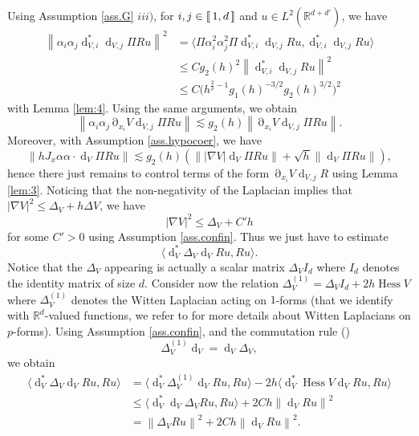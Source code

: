 \documentclass[12pt]{amsart}
\newcommand{\R}{\mathbb R}
\newcommand{\Hess}{\operatorname{Hess}}
\def\<{\langle}
\def\>{\rangle}
\renewcommand{\d}{\operatorname{d}}
\numberwithin{equation}{section}
\numberwithin{figure}{section}
\DeclareMathOperator{\p}{\partial}
\newcommand{\vvert}[1]{\left\lVert#1\right\rVert}
\newcommand{\lb}{\operatorname{[\negthinspace [}}
\newcommand{\rb}{\operatorname{]\negthinspace ]}}
\begin{document}
Using Assumption \ref{ass.G} $iii)$, for $i,j\in\lb1,d\rb$ and $u\in L^2(\R^{d+d'})$, we have
\begin{equation*}
\begin{aligned}
    \vvert{\alpha_i\alpha_j\d_{V,i}^*\d_{V,j}\Pi Ru}^2 &= \<\Pi \alpha_i^2\alpha_j^2\Pi\d_{V,i}^*\d_{V,j}Ru,\d_{V,i}^*\d_{V,j}Ru\>\\
    &\leq Cg_2(h)^2\vvert{\d_{V,i}^*\d_{V,j}Ru}^2\\
    &\leq C\big(h^{\frac{2}{\overline{\nu}} - 1}g_1(h)^{-3/2}g_2(h)^{3/2}\big)^2
\end{aligned}
\end{equation*}
with Lemma \ref{lem:4}. Using the same arguments, we obtain
\begin{equation*}
\vvert{\alpha_i\alpha_j\p_{x_i}V\d_{V,j}\Pi Ru} \lesssim g_2(h)\vvert{\p_{x_i}V\d_{V,j}\Pi Ru}.
\end{equation*}
Moreover, with Assumption \ref{ass.hypocoer}, we have
\begin{equation*}
\vvert{hJ_x\alpha\alpha\cdot\d_V\Pi Ru} \lesssim g_2(h)(\vvert{|\nabla V|\d_V\Pi Ru} + \sqrt{h}\vvert{\d_V\Pi Ru}),
\end{equation*}
hence there just remains to control terms of the form $\p_{x_i}V\d_{V,j}R$ using Lemma \ref{lem:3}. Noticing that the non-negativity of the Laplacian implies that $|\nabla V|^2\leq \Delta_V + h\Delta V$, we have
\begin{equation}\label{eq:nablaVleqDeltaV}
|\nabla V|^2\leq\Delta_V + C'h
\end{equation}
for some $C'>0$ using Assumption \ref{ass.confin}. Thus we just have to estimate
\begin{equation*}
\<\d_V^*\Delta_V\d_VRu,Ru\>.
\end{equation*}
Notice that the $\Delta_V$ appearing is actually a scalar matrix $\Delta_VI_d$ where $I_d$ denotes the identity matrix of size $d$. Consider now the relation $\Delta_V^{(1)} = \Delta_VI_d + 2h\Hess V$ where $\Delta_V^{(1)}$ denotes the Witten Laplacian acting on $1$-forms (that we identify with $\R^d$-valued functions, we refer to \cite{HeSj85_01} for more details about Witten Laplacians on $p$-forms). Using Assumption \ref{ass.confin}, and the commutation rule (\cite[(2.1)]{HeKlNi04_01})
\begin{equation*}
\Delta_V^{(1)}\d_V = \d_V\Delta_V,
\end{equation*}
we obtain
\begin{equation*}
\begin{aligned}
    \<\d_V^*\Delta_V\d_VRu,Ru\> &= \<\d_V^*\Delta_V^{(1)}\d_VRu,Ru\> - 2h\<\d_V^*\Hess V\d_VRu,Ru\>\\
    &\leq \<\d_V^*\d_V\Delta_VRu,Ru\> + 2Ch\vvert{\d_VRu}^2\\
    &= \vvert{\Delta_VRu}^2 + 2Ch\vvert{\d_VRu}^2.
\end{aligned}
\end{equation*}
\end{document}
